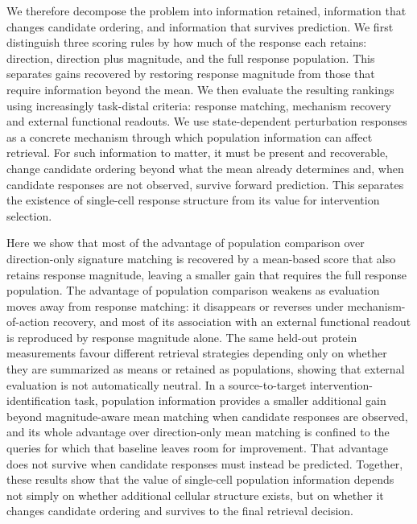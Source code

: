 \documentclass[11pt,letterpaper]{article}
\begin{document}
We therefore decompose the problem into information retained, information that changes candidate ordering, and information that survives prediction. We first distinguish three scoring rules by how much of the response each retains: direction, direction plus magnitude, and the full response population. This separates gains recovered by restoring response magnitude from those that require information beyond the mean. We then evaluate the resulting rankings using increasingly task-distal criteria: response matching, mechanism recovery and external functional readouts\cite{GDSC,GDSCLandscape}. We use state-dependent perturbation responses as a concrete mechanism through which population information can affect retrieval. For such information to matter, it must be present and recoverable, change candidate ordering beyond what the mean already determines and, when candidate responses are not observed, survive forward prediction. This separates the existence of single-cell response structure from its value for intervention selection.

Here we show that most of the advantage of population comparison over direction-only signature matching is recovered by a mean-based score that also retains response magnitude, leaving a smaller gain that requires the full response population. The advantage of population comparison weakens as evaluation moves away from response matching: it disappears or reverses under mechanism-of-action recovery, and most of its association with an external functional readout is reproduced by response magnitude alone. The same held-out protein measurements favour different retrieval strategies depending only on whether they are summarized as means or retained as populations, showing that external evaluation is not automatically neutral. In a source-to-target intervention-identification task, population information provides a smaller additional gain beyond magnitude-aware mean matching when candidate responses are observed, and its whole advantage over direction-only mean matching is confined to the queries for which that baseline leaves room for improvement. That advantage does not survive when candidate responses must instead be predicted. Together, these results show that the value of single-cell population information depends not simply on whether additional cellular structure exists, but on whether it changes candidate ordering and survives to the final retrieval decision.
\end{document}
